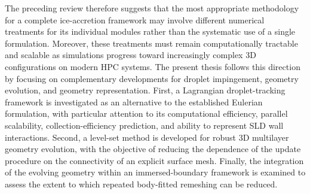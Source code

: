 The preceding review therefore suggests that the most appropriate methodology for a complete ice-accretion framework may involve different numerical treatments for its individual modules rather than the systematic use of a single formulation. Moreover, these treatments must remain computationally tractable and scalable as simulations progress toward increasingly complex 3D configurations on modern HPC systems. The present thesis follows this direction by focusing on complementary developments for droplet impingement, geometry evolution, and geometry representation. First, a Lagrangian droplet-tracking framework is investigated as an alternative to the established Eulerian formulation, with particular attention to its computational efficiency, parallel scalability, collection-efficiency prediction, and ability to represent SLD wall interactions. Second, a level-set method is developed for robust 3D multilayer geometry evolution, with the objective of reducing the dependence of the update procedure on the connectivity of an explicit surface mesh. Finally, the integration of the evolving geometry within an immersed-boundary framework is examined to assess the extent to which repeated body-fitted remeshing can be reduced.
